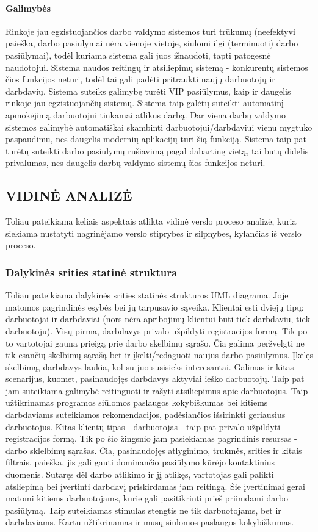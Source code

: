 \documentclass{VUMIFPSkursinis}
\begin{document}
\paragraph{Galimybės}
Rinkoje jau egzistuojančios darbo valdymo sistemos turi trūkumų (neefektyvi paieška, darbo pasiūlymai nėra vienoje vietoje, siūlomi ilgi (terminuoti) darbo pasiūlymai), todėl kuriama sistema gali juos išnaudoti, tapti patogesnė naudotojui. Sistema naudos reitingų ir atsiliepimų sistemą - konkurentų sistemos čios funkcijos neturi, todėl tai gali padėti pritraukti naujų darbuotojų ir darbdavių. Sistema suteiks galimybę turėti VIP pasiūlymus, kaip ir daugelis rinkoje jau egzistuojančių sistemų. Sistema taip galėtų suteikti automatinį apmokėjimą darbuotojui tinkamai atlikus darbą. Dar viena darbų valdymo sistemos galimybė automatiškai skambinti darbuotojui/darbdaviui vienu mygtuko paspaudimu, nes daugelis modernių aplikacijų turi šią funkciją. Sistema taip pat turėtų suteikti darbo pasiūlymų rūšiavimą pagal dabartinę vietą, tai būtų didelis privalumas, nes daugelis darbų valdymo sistemų šios funkcijos neturi.
\newpage
\subsection{VIDINĖ ANALIZĖ}
Toliau pateikiama keliais aspektais atlikta vidinė verslo proceso analizė, kuria siekiama nustatyti nagrinėjamo verslo stiprybes ir silpnybes, kylančias iš verslo proceso.

\subsubsection{Dalykinės srities statinė struktūra}
Toliau pateikiama dalykinės srities statinės struktūros UML diagrama. Joje matomos pagrindinės esybės bei jų tarpusavio sąveika. Klientai esti dviejų tipų: darbuotojai ir darbdaviai (nors nėra apribojimų klientui būti tiek darbdaviu, tiek darbuotoju). Visų pirma, darbdavys privalo užpildyti registracijos formą. Tik po to vartotojai gauna prieigą prie darbo skelbimų sąrašo. Čia galima peržvelgti ne tik esančių skelbimų sąrašą bet ir įkelti/redaguoti naujus darbo pasiūlymus. Įkėlęs skelbimą, darbdavys laukia, kol su juo susisieks interesantai. Galimas ir kitas scenarijus, kuomet, pasinaudojęs darbdavys aktyviai ieško darbuotojų. Taip pat jam suteikiama galimybė reitinguoti ir rašyti atsiliepimus apie darbuotojus. Taip užtikrinamas programos siūlomos paslaugos kokybiškumas bei kitiems darbdaviams suteikiamos rekomendacijos, padėsiančios išsirinkti geriausius darbuotojus. Kitas klientų tipas - darbuotojas - taip pat privalo užpildyti registracijos formą. Tik po šio žingsnio jam pasiekiamas pagrindinis resursas - darbo sklelbimų sąrašas. Čia, pasinaudojęs atlyginimo, trukmės, srities ir kitais filtrais, paieška, jis gali gauti dominančio pasiūlymo kūrėjo kontaktinius duomenis. Sutaręs dėl darbo atlikimo ir jį atlikęs, vartotojas gali palikti atsliepimą bei įvertinti darbdavį priskirdamas jam reitingą. Šie įvertinimai gerai matomi kitiems darbuotojams, kurie gali pasitikrinti prieš priimdami darbo pasiūlymą. Taip suteikiamas stimulas stengtis ne tik darbuotojams, bet ir darbdaviams. Kartu užtikrinamas ir mūsų siūlomos paslaugos kokybiškumas. 
\end{document}
